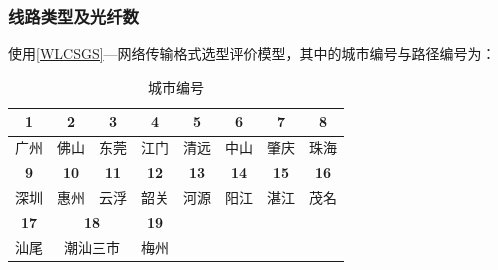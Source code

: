 \documentclass[UTF8,12pt]{ctexart}
\begin{document}
\subsubsection{线路类型及光纤数}
使用\ref{WLCSGS}—网络传输格式选型评价模型，其中的城市编号与路径编号为：
\begin{table}[htbp]
    \centering
    \caption{城市编号}
    \begin{tabular}{cccccccc}
        \toprule
        \multicolumn{1}{c}{\textbf{1}}  & \multicolumn{1}{c}{\textbf{2}}  & \textbf{3}                      & \multicolumn{1}{c}{\textbf{4}}  & \textbf{5}               & \textbf{6}               & \textbf{7}               & \textbf{8}               \\
        \midrule
        广州                            & 佛山                            & \multicolumn{1}{c}{东莞}        & 江门                            & \multicolumn{1}{c}{清远} & \multicolumn{1}{c}{中山} & \multicolumn{1}{c}{肇庆} & \multicolumn{1}{c}{珠海} \\
        \midrule
        \multicolumn{1}{c}{\textbf{9}}  & \multicolumn{1}{c}{\textbf{10}} & \textbf{11}                     & \multicolumn{1}{c}{\textbf{12}} & \textbf{13}              & \textbf{14}              & \textbf{15}              & \textbf{16}              \\
        \midrule
        深圳                            & 惠州                            & \multicolumn{1}{c}{云浮}        & 韶关                            & \multicolumn{1}{c}{河源} & \multicolumn{1}{c}{阳江} & \multicolumn{1}{c}{湛江} & \multicolumn{1}{c}{茂名} \\
        \midrule
        \multicolumn{1}{c}{\textbf{17}} & \multicolumn{2}{c}{\textbf{18}} & \multicolumn{1}{c}{\textbf{19}} &                                 &                          &                          &                                                     \\
        \midrule
        汕尾                            & \multicolumn{2}{c}{潮汕三市}    & 梅州                            &                                 &                          &                          &                                                     \\
        \bottomrule
    \end{tabular}%
\end{table}%
\end{document}
